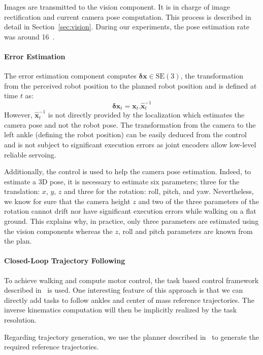 Images are transmitted to the vision component. It is in charge of image rectification and current camera pose computation. This process is described in detail in Section~\ref{sec:vision}.  During our
experiments, the pose estimation rate was around 16~\hertz.

\paragraph{Error Estimation}
The error estimation component computes $\mathbf{\delta x} \in \text{SE}(3)$, the transformation from the perceived robot position to the planned robot position and is defined at time $t$ as:
%
\begin{equation} \label{eq:errorpos}
  \mathbf{\delta x}_t = \mathbf{x}_t . \hat{\mathbf{x}}_t^{-1}
\end{equation}
%
However, $\hat{\mathbf{x}}_t^{-1}$ is not directly provided by the localization which estimates the camera pose and not the robot pose. The transformation from the camera to the left ankle (defining
the robot position) can be easily deduced from the control and is not subject to significant execution errors as joint encoders allow low-level reliable servoing.

Additionally, the control is used to help the camera pose estimation. Indeed, to estimate a 3D pose, it is necessary to estimate six parameters; three for the translation: $x$, $y$, $z$ and three for
the rotation: roll, pitch, and yaw. Nevertheless, we know for sure that the camera height $z$ and two of the three parameters of the rotation cannot drift nor have significant execution errors while
walking on a flat ground. This explains why, in practice, only three parameters are estimated using the vision components whereas the $z$, roll and pitch parameters are known from the plan.

\paragraph{Closed-Loop Trajectory Following}
To achieve walking and compute motor control, the task based control framework described in~\cite{Mansard09icar} is used. One interesting feature of this approach is that we can directly add tasks to follow ankles and center of mass reference trajectories. The inverse kinematics computation will then be implicitly realized by the task resolution.

Regarding trajectory generation, we use the planner described in~\cite{Dalibard11humanoids} to generate the required reference trajectories.

